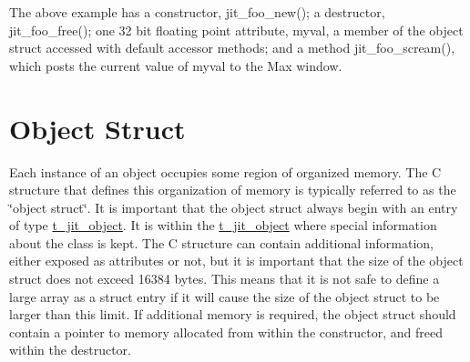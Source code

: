 The above example has a constructor, jit\_\-foo\_\-new(); a destructor, jit\_\-foo\_\-free(); one 32 bit floating point attribute, myval, a member of the object struct accessed with default accessor methods; and a method jit\_\-foo\_\-scream(), which posts the current value of myval to the Max window.\hypertarget{chapter_jit_objectmodel_chapter_jit_objectmodel_struct}{}\section{Object Struct}\label{chapter_jit_objectmodel_chapter_jit_objectmodel_struct}
Each instance of an object occupies some region of organized memory. The C structure that defines this organization of memory is typically referred to as the \char`\"{}object struct\char`\"{}. It is important that the object struct always begin with an entry of type \hyperlink{group__jitter_ga0eb2cd9c8e3b9803ba31069575a1ffb9}{t\_\-jit\_\-object}. It is within the \hyperlink{group__jitter_ga0eb2cd9c8e3b9803ba31069575a1ffb9}{t\_\-jit\_\-object} where special information about the class is kept. The C structure can contain additional information, either exposed as attributes or not, but it is important that the size of the object struct does not exceed 16384 bytes. This means that it is not safe to define a large array as a struct entry if it will cause the size of the object struct to be larger than this limit. If additional memory is required, the object struct should contain a pointer to memory allocated from within the constructor, and freed within the destructor.


